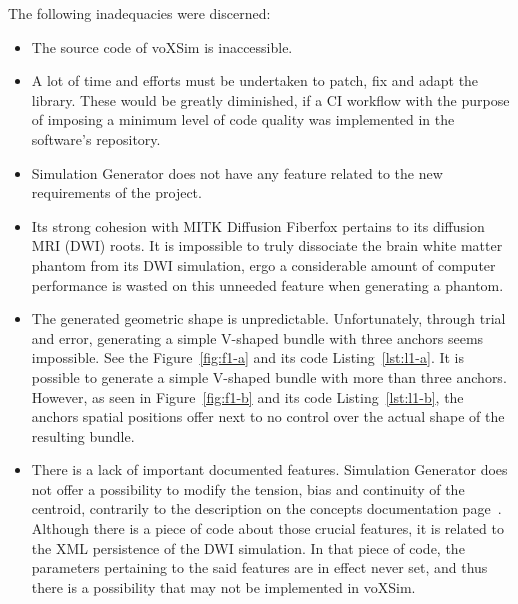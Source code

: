 \documentclass{article}
\begin{document}
  The following inadequacies were discerned:
  \begin{itemize}
    \item The source code of voXSim is inaccessible.
    \item A lot of time and efforts must be undertaken to patch, fix and adapt the library.
    These would be greatly diminished, if a CI workflow with the purpose of imposing a minimum level of code quality was implemented in the software's repository.
    \item Simulation Generator does not have any feature related to the new requirements of the project.
    \item Its strong cohesion with MITK Diffusion Fiberfox pertains to its diffusion MRI (DWI) roots.
    It is impossible to truly dissociate the brain white matter phantom from its DWI simulation, ergo a considerable amount of computer performance is wasted on this unneeded feature when generating a phantom.
    \item The generated geometric shape is unpredictable.
    Unfortunately, through trial and error, generating a simple V-shaped bundle with three anchors seems impossible.
    See the Figure~\ref{fig:f1-a} and its code Listing~\ref{lst:l1-a}.
    It is possible to generate a simple V-shaped bundle with more than three anchors.
    However, as seen in Figure~\ref{fig:f1-b} and its code Listing~\ref{lst:l1-b}, the anchors spatial positions offer next to no control over the actual shape of the resulting bundle.
    \item There is a lack of important documented features.
    Simulation Generator does not offer a possibility to modify the tension, bias and continuity of the centroid, contrarily to the description on the concepts documentation page~\cite{valcourtcaron2022simulationgenerator}.
    Although there is a piece of code about those crucial features, it is related to the XML persistence of the DWI simulation.
    In that piece of code, the parameters pertaining to the said features are in effect never set, and thus there is a possibility that may not be implemented in voXSim.
  \end{itemize}
\end{document}
